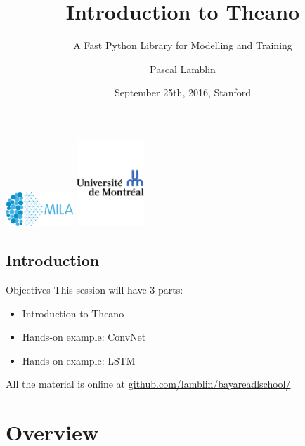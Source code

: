 \documentclass[a4paper,9pt]{beamer}
\title[Intro to Theano]{Introduction to Theano}
\subtitle{A Fast Python Library for Modelling and Training}
\author[MILA]{Pascal Lamblin}
\institute{%
Montreal Institute for Learning Algorithms (MILA)\\
Université de Montréal}
\date{%
September 25th, 2016, Stanford
}
\begin{document}
\begin{frame}[plain]
  \titlepage
  \includegraphics[width=1in]{MILA_official_2016.png}
  \hfill
  \includegraphics[width=1in]{UdeM_logo.pdf}
\end{frame}


\subsection*{Introduction}

\begin{frame}{Objectives}
  This session will have 3 parts:
  \begin{itemize}
    \item Introduction to Theano
    \item Hands-on example: ConvNet
    \item Hands-on example: LSTM
  \end{itemize}
  All the material is online at
  \url{github.com/lamblin/bayareadlschool/}

\end{frame}


\section{Overview}
\begin{frame}
  \tableofcontents[currentsection]
\end{frame}
\end{document}
